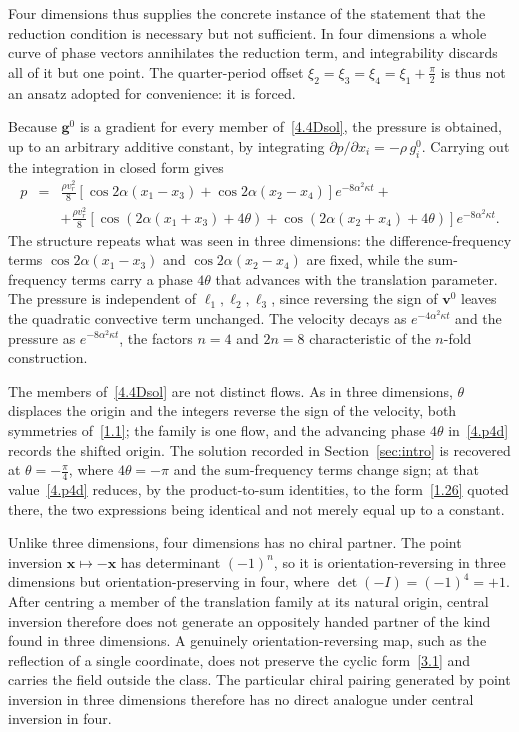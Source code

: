 \documentclass[11pt]{jfm}
\numberwithin{equation}{section}
\begin{document}
Four dimensions thus supplies the concrete instance of the statement that the reduction condition
is necessary but not sufficient. In four dimensions a whole curve of phase vectors annihilates the reduction term, and
integrability discards all of it but one point. The quarter-period offset
$\xi_2=\xi_3=\xi_4=\xi_1+\tfrac{\pi}{2}$ is thus not an ansatz adopted for convenience: it is
forced.

Because $\boldsymbol{g}^0$ is a gradient for every member of~\eqref{4.4Dsol}, the pressure is
obtained, up to an arbitrary additive constant, by integrating
$\partial p/\partial x_i=-\rho\,g_i^0$. Carrying out the integration in closed form gives
\begin{eqnarray}
\label{4.p4d}
p&=&\frac{\rho v_r^2}{8}\left[\cos 2\alpha(x_1-x_3)+\cos 2\alpha(x_2-x_4)\right]e^{-8\alpha^2\kappa t}+\nonumber\\
 &&+\frac{\rho v_r^2}{8}\left[\cos\!\left(2\alpha(x_1+x_3)+4\theta\right)+\cos\!\left(2\alpha(x_2+x_4)+4\theta\right)\right]e^{-8\alpha^2\kappa t}.
\end{eqnarray}
The structure repeats what was seen in three dimensions: the difference-frequency terms
$\cos 2\alpha(x_1-x_3)$ and $\cos 2\alpha(x_2-x_4)$ are fixed, while the sum-frequency terms carry
a phase $4\theta$ that advances with the translation parameter. The pressure is independent of
$\ell_1,\ell_2,\ell_3$, since reversing the sign of $\boldsymbol{v}^0$ leaves the quadratic
convective term unchanged. The velocity decays as $e^{-4\alpha^2\kappa t}$ and the pressure as
$e^{-8\alpha^2\kappa t}$, the factors $n=4$ and $2n=8$ characteristic of the $n$-fold
construction.

The members of~\eqref{4.4Dsol} are not distinct flows. As in three dimensions, $\theta$ displaces
the origin and the integers reverse the sign of the velocity, both symmetries of~\eqref{1.1}; the
family is one flow, and the advancing phase $4\theta$ in~\eqref{4.p4d} records the shifted origin.
The solution recorded in Section~\ref{sec:intro} is recovered at $\theta=-\tfrac{\pi}{4}$, where
$4\theta=-\pi$ and the sum-frequency terms change sign; at that value~\eqref{4.p4d} reduces, by the
product-to-sum identities, to the form~\eqref{1.26} quoted there, the two expressions being
identical and not merely equal up to a constant.

Unlike three dimensions, four dimensions has no chiral partner. The point inversion
$\boldsymbol{x}\mapsto-\boldsymbol{x}$ has determinant $(-1)^n$, so it is orientation-reversing in
three dimensions but orientation-preserving in four, where $\det(-I)=(-1)^4=+1$. After centring a
member of the translation family at its natural origin, central inversion therefore does not
generate an oppositely handed partner of the kind found in three dimensions. A genuinely
orientation-reversing map, such as the reflection of a single coordinate, does not preserve the
cyclic form~\eqref{3.1} and carries the field outside the class. The particular chiral pairing
generated by point inversion in three dimensions therefore has no direct analogue under central
inversion in four.
\end{document}
